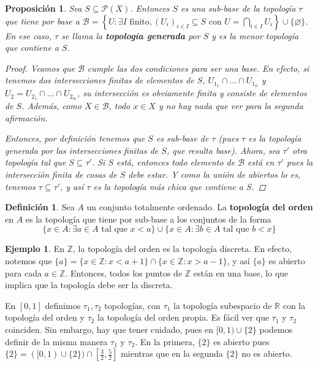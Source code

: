 \documentclass[12pt]{book}
\newtheorem{prop}[teo]{Proposición}
\theoremstyle{definition}
\newtheorem{defn}[teo]{Definición}
\newtheorem{ex}[teo]{Ejemplo}
\newcommand{\RR}{\mathbb{R}}      %
\newcommand{\ZZ}{\mathbb{Z}}      %
\newcommand{\PP}{\mathscr{P}}
\let\emptyset\varnothing
\begin{document}
\begin{prop}
Sea $S\subseteq \PP(X)$. Entonces $S$ es una sub-base de la topología $\tau$ que tiene por base a $\mathscr{B}=\left\{U : \exists I \text{ finito}, (U_i)_{i\in I}\subseteq S \text{ con } U = \displaystyle\bigcap_{i\in I}U_i \right\}\cup\{\emptyset\}$. En ese caso, $\tau$ se llama la \textbf{topología generada} por $S$ y es la menor topología que contiene a $S$.
\begin{proof}
Veamos que $\mathscr{B}$ cumple las dos condiciones para ser una base. En efecto, si tenemos dos intersecciones finitas de elementos de $S$, $U_{1_1}\cap\ldots\cap U_{1_n}$ y $U_2 = U_{2_1}\cap\ldots\cap U_{2_m}$, su intersección es obviamente finita y consiste de elementos de $S$. Además, como $X\in\mathscr{B}$, todo $x\in X$ y no hay nada que ver para la segunda afirmación.

Entonces, por definición tenemos que $S$ es sub-base de $\tau$ (pues $\tau$ es la topología generada por las intersecciones finitas de $S$, que resulta base). Ahora, sea $\tau'$ otra topología tal que $S\subseteq \tau'$. Si $S$ está, entonces todo elemento de $\mathscr{B}$ está en $\tau'$ pues la intersección finita de cosas de $S$ debe estar. Y como la unión de abiertos lo es, tenemos $\tau\subseteq \tau'$, y así $\tau$ es la topología más chica que contiene a $S$.
\end{proof}
\end{prop}

\begin{defn}
Sea $A$ un conjunto totalmente ordenado. La \textbf{topología del orden} en $A$ es la topología que tiene por sub-base a los conjuntos de la forma $$\{x\in A : \exists a\in A \text{ tal que } x< a\}\cup \{x\in A : \exists b\in A \text{ tal que } b<x\}$$
\end{defn}

\begin{ex}
En $\ZZ$, la topología del orden es la topología discreta. En efecto, notemos que $\{a\} = \{x\in\ZZ : x < a+1\}\cap \{x\in\ZZ : x>a-1\}$, y así $\{a\}$ es abierto para cada $a\in\ZZ$. Entonces, todos los puntos de $\ZZ$ están en una base, lo que implica que la topología debe ser la discreta.

En $[0,1]$ definimos $\tau_1,\tau_2$ topologías, con $\tau_1$ la topología subespacio de $\RR$ con la topología del orden y $\tau_2$ la topología del orden propia. Es fácil ver que $\tau_1$ y $\tau_2$ coinciden. Sin embargo, hay que tener cuidado, pues en $[0,1)\cup\{2\}$ podemos definir de la misma manera $\tau_1$ y $\tau_2$. En la primera, $\{2\}$ es abierto pues $\{2\} = ([0,1)\cup \{2\})\cap [\frac{3}{2},\frac{5}{2}]$ mientras que en la segunda $\{2\}$ no es abierto.
\end{ex}
\end{document}
